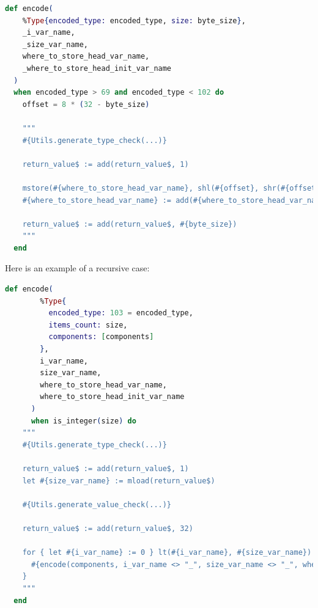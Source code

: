 \begin{lstlisting}[language=elixir, caption={Encode base case}, label={lst:encode_base_case}]
  def encode(
    %Type{encoded_type: encoded_type, size: byte_size},
    _i_var_name,
    _size_var_name,
    where_to_store_head_var_name,
    _where_to_store_head_init_var_name
  )
  when encoded_type > 69 and encoded_type < 102 do
    offset = 8 * (32 - byte_size)

    """
    #{Utils.generate_type_check(...)}

    return_value$ := add(return_value$, 1)

    mstore(#{where_to_store_head_var_name}, shl(#{offset}, shr(#{offset}, mload(return_value$))))
    #{where_to_store_head_var_name} := add(#{where_to_store_head_var_name}, 32)

    return_value$ := add(return_value$, #{byte_size})
    """
  end
\end{lstlisting}

Here is an example of a recursive case:

\begin{lstlisting}[language=elixir, caption={Encode recursive case}, label={lst:encode_recursive_case}]
  def encode(
        %Type{
          encoded_type: 103 = encoded_type,
          items_count: size,
          components: [components]
        },
        i_var_name,
        size_var_name,
        where_to_store_head_var_name,
        where_to_store_head_init_var_name
      )
      when is_integer(size) do
    """
    #{Utils.generate_type_check(...)}

    return_value$ := add(return_value$, 1)
    let #{size_var_name} := mload(return_value$)

    #{Utils.generate_value_check(...)}

    return_value$ := add(return_value$, 32)

    for { let #{i_var_name} := 0 } lt(#{i_var_name}, #{size_var_name}) { #{i_var_name} := add(#{i_var_name}, 1) } {
      #{encode(components, i_var_name <> "_", size_var_name <> "_", where_to_store_head_var_name, where_to_store_head_init_var_name)}
    }
    """
  end
\end{lstlisting}
    



